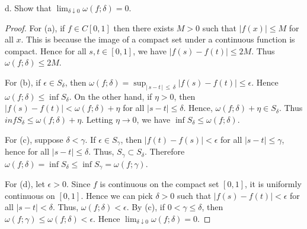\documentclass{article}
\begin{document}
d. Show that $\lim_{\delta \downarrow 0} \omega(f; \delta) = 0$.

\begin{proof}
For (a), if $f \in C[0,1]$ then there exists $M > 0$ such that $|f(x)| \le M$ for all $x$. This is because the image of a compact set under a continuous function is compact. Hence for all $s, t \in [0,1]$, we have $|f(s) - f(t)| \le 2M$.  Thus $\omega(f;\delta) \le 2M$.

For (b), if $\epsilon \in S_\delta$, then $\omega(f; \delta) = \sup_{|\,s-t\,|\,\le\, \delta} |f(s)-f(t)| \le \epsilon$. Hence $\omega(f; \delta) \le \inf S_\delta$.  On the other hand, if $\eta > 0$, then $|f(s) - f(t)| < \omega(f; \delta) + \eta$ for all $|s - t| \le \delta$.  Hence, $\omega(f; \delta) + \eta \in S_\delta$.  Thus $inf S_\delta \le \omega(f; \delta) + \eta$.  Letting $\eta \to 0$, we have $\inf S_\delta \le \omega(f ; \delta)$.

For (c), suppose $\delta < \gamma$.  If $\epsilon \in S_\gamma$, then $|f(t) - f(s)| < \epsilon$ for all $|s - t| \le \gamma$, hence for all $|s - t| \le \delta$.  Thus, $S_\gamma \subset S_\delta$.  Therefore $\omega(f; \delta) = \inf S_\delta \le \inf S_\gamma = \omega(f ; \gamma)$.

For (d), let $\epsilon > 0$.  Since $f$ is continuous on the compact set $[0,1]$, it is uniformly continuous on $[0,1]$.  Hence we can pick $\delta > 0$ such that $|f(s) - f(t)| < \epsilon$ for all $|s - t| < \delta$.  Thus, $\omega(f; \delta) < \epsilon$.  By (c), if $0 < \gamma \le \delta$, then $\omega(f ; \gamma) \le \omega(f ; \delta) < \epsilon$.  Hence $\lim_{\delta \downarrow 0} \omega(f; \delta) = 0$.
\end{proof}
\end{document}

